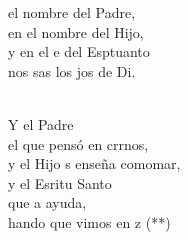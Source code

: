 \documentclass[12pt]{article}
\begin{document}
\begin{multicols*}{2}
\begin{cancion}%
	\begin{chorus}%
	 el nombre del Padre,  \\
en el nombre del Hijo,  \\
	y en el e del Esptuanto\\
	nos sas los jos de Di.\\
	\end{chorus}%
	\jump\\
	Y el Padre  \\
	el que pensó en crrnos,\\
	y el Hijo s enseña comomar, \\
	y el Esritu Santo  \\
	que  a ayuda,\\
	hando que vimos en z (**)\\
\end{cancion}%


\end{multicols*}
\end{document}
